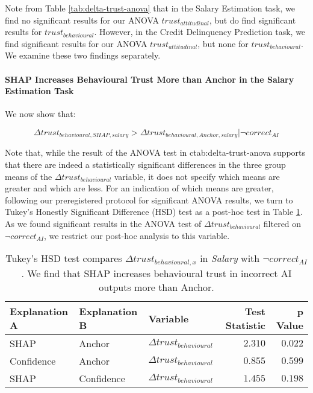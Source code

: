 Note from Table \ref{tab:delta-trust-anova} that in the Salary Estimation task, we find no significant results for our ANOVA $trust_{attitudinal}$, but do find significant results for $trust_{behavioural}$. However, in the Credit Delinquency Prediction task, we find significant results for our ANOVA $trust_{attitudinal}$, but none for $trust_{behavioural}$. We examine these two findings separately.

\paragraph{SHAP Increases Behavioural Trust More than Anchor in the Salary Estimation Task}
We now show that:

\begin{equation}
    \Delta trust_{behavioural,SHAP,salary} > \Delta trust_{behavioural,Anchor,salary} | \neg correct_{AI}
\end{equation}

\noindent Note that, while the result of the ANOVA test in c{tab:delta-trust-anova} supports that there are indeed a statistically significant differences in the three group means of the $\Delta trust_{behavioural}$ variable, it does not specify which means are greater and which are less. For an indication of which means are greater, following our preregistered protocol for significant ANOVA results, we turn to Tukey's Honestly Significant Difference (HSD) test as a post-hoc test in Table \ref{tab:delta-trust-hsd}. As we found significant results in the ANOVA test of $\Delta trust_{behavioural}$ filtered on $\neg correct_{AI}$, we restrict our post-hoc analysis to this variable.

\begin{table}[htb]
    \centering
    \caption{Tukey's HSD test compares $\Delta trust_{behavioural,x}$ in \emph{Salary} with $\neg correct_{AI}$. We find that SHAP increases behavioural trust in incorrect AI outputs more than Anchor.}
    \label{tab:delta-trust-hsd}
    \begin{tabular}{lllrr}
        \toprule
        Explanation A & Explanation B & Variable & Test Statistic & p Value \\
        \midrule
        SHAP & Anchor & $\Delta trust_{behavioural}$ & $\mathbf{2.310}$ & $\mathbf{0.022}$ \\
        Confidence & Anchor & $\Delta trust_{behavioural}$ & $0.855$ & $0.599$ \\
        SHAP & Confidence & $\Delta trust_{behavioural}$ & $1.455$ & $0.198$ \\
        \bottomrule
    \end{tabular}
\end{table}

